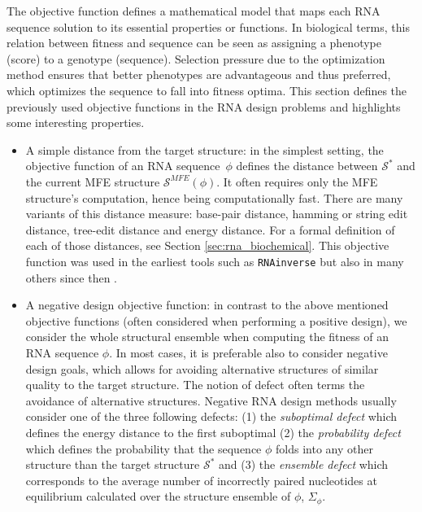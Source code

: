 The objective function defines a mathematical model that maps each RNA sequence solution to its essential properties or functions. In biological terms, this relation between fitness and sequence can be seen as assigning a phenotype (score) to a genotype (sequence). Selection pressure due to the optimization method ensures that better phenotypes are advantageous and thus preferred, which optimizes the sequence to fall into fitness optima. This section defines the previously used objective functions in the RNA design problems and highlights some interesting properties.
\begin{itemize}
\item A simple distance from the target structure: in the simplest setting, the objective function of an RNA sequence~\(\phi\) defines the distance between $\mathcal{S}^*$ and the current MFE structure $\mathcal{S}^{MFE} (\phi)$. It often requires only the MFE structure's computation, hence being computationally fast. There are many variants of this distance measure: base-pair distance, hamming or string edit distance, tree-edit distance and energy distance. For a formal definition of each of those distances, see Section \ref{sec:rna_biochemical}. This objective function was used in the earliest tools such as \texttt{RNAinverse} \cite{hofacker1994fast} but also in many others since then \cite{andronescu2004new, busch2006info, gao2010inverse} . 

\item A negative design objective function: in contrast to the above mentioned objective functions (often considered when performing a positive design), we consider the whole structural ensemble when computing the fitness of an RNA sequence $\phi$. In most cases, it is preferable also to consider negative design goals, which allows for avoiding alternative structures of similar quality to the target structure.
The notion of defect often terms the avoidance of alternative structures. Negative RNA design methods usually consider one of the three following defects: (1) the \textit{suboptimal defect} \cite{hofacker1994fast, flamm2001design, dirks2003partition, zadeh2011nupack} which defines the energy distance to the first suboptimal (2) the \textit{probability defect} \cite{zadeh2011nupack, hofacker1994fast} which defines the probability that the sequence $\phi$ folds into any other structure than the target structure $\mathcal{S}^*$  and (3) the \textit{ensemble defect} \cite{zadeh2011nupack} which corresponds to the average number of incorrectly paired nucleotides at equilibrium calculated over the structure ensemble of $\phi$, $\Sigma_{\phi}$. 


\end{itemize}
